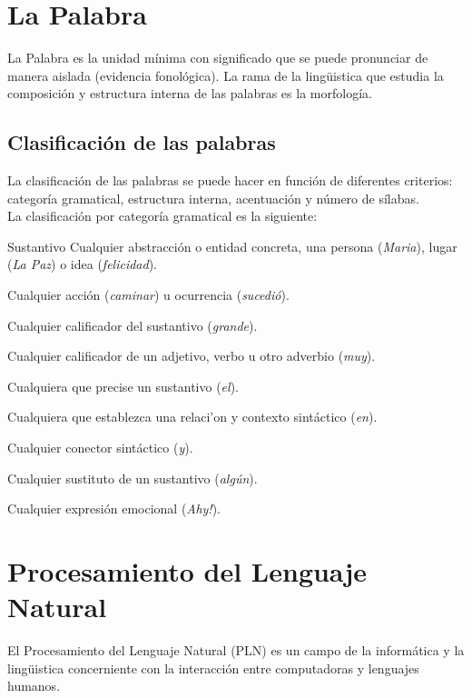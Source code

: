 \section{La Palabra}
La Palabra es la unidad m\'inima con significado que se puede pronunciar de manera
aislada (evidencia fonol\'ogica)\cite{HOET09}. La rama de la ling\"uistica que estudia
la composici\'on y estructura interna de las palabras es la morfolog\'ia.

\subsection{Clasificaci\'on de las palabras}
La clasificaci\'on de las palabras se puede hacer en funci\'on de diferentes criterios:
categor\'ia gramatical, estructura interna, acentuaci\'on y n\'umero de s\'ilabas. \\

La clasificaci\'on por categor\'ia gramatical es la siguiente:

\begin{description}[leftmargin=0cm]
	\item{Sustantivo} Cualquier abstracci\'on o entidad concreta, una 
	persona (\emph{Maria}), lugar (\emph{La Paz}) o idea (\emph{felicidad}).
	\item[Verbo] Cualquier acci\'on (\emph{caminar}) u ocurrencia (\emph{sucedi\'o}).
	\item[Adjetivo] Cualquier calificador del sustantivo (\emph{grande}).
	\item[Adverbio] Cualquier calificador de un adjetivo, verbo u otro
	adverbio (\emph{muy}).
	\item[Determinante] Cualquiera que precise un sustantivo (\emph{el}).
	\item[Preposici\'on] Cualquiera que establezca una relaci'on y contexto sint\'actico
	(\emph{en}).
	\item[Conjunci\'on] Cualquier conector sint\'actico (\emph{y}).
	\item[Pronombre] Cualquier sustituto de un sustantivo (\emph{alg\'un}).
	\item[Interjecci\'on] Cualquier expresi\'on emocional (\emph{Ahy!}).
\end{description}


\section{Procesamiento del Lenguaje Natural}
El Procesamiento del Lenguaje Natural (PLN) es un campo de la inform\'atica y la 
ling\"uistica concerniente con la interacci\'on entre computadoras y lenguajes
humanos. \\

